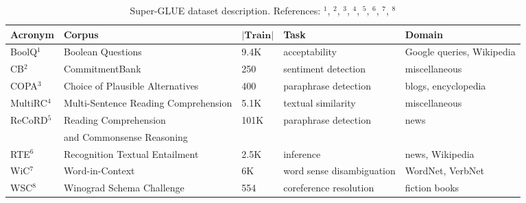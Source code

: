 \documentclass{article} \usepackage{iclr2021_conference,times}
\begin{document}
\begin{table}[ht]
\caption{\small Super-GLUE \citep{superglue} dataset description. References: $^1$\citet{boolq}, $^2$\citet{cb}, $^3$\citet{copa},  $^4$\citet{multirc}, $^5$\citet{record}, $^6$\citet{superglue}, $^7$\citet{wic}, $^8$\citet{wnli} }
\begin{adjustbox}{width=\columnwidth,center}
\begin{tabular}{|l|l|l|l|l|}
	\hline 
		\textbf{Acronym} & \textbf{Corpus} & $\lvert\textbf{Train}\rvert$ & \textbf{Task} & \textbf{Domain}  \\
		\hline
		BoolQ$^1$   & Boolean Questions  & 9.4K & acceptability & Google queries, Wikipedia \\
		CB$^2$      & CommitmentBank & 250 & sentiment detection & miscellaneous \\
		COPA$^3$    & Choice of Plausible Alternatives & 400 & paraphrase detection & blogs, encyclopedia \\
		MultiRC$^4$ & Multi-Sentence Reading Comprehension & 5.1K & textual similarity & miscellaneous \\
		ReCoRD$^5$  & Reading Comprehension & 101K & paraphrase detection & news \\
		            & and Commonsense Reasoning & & & \\
		RTE$^6$     & Recognition Textual Entailment & 2.5K & inference & news, Wikipedia \\
		WiC$^7$     & Word-in-Context & 6K & word sense disambiguation & WordNet, VerbNet \\
		WSC$^8$     & Winograd Schema Challenge & 554 & coreference resolution & fiction books \\

    \hline
\end{tabular}
\end{adjustbox}
\end{table}
\end{document}
